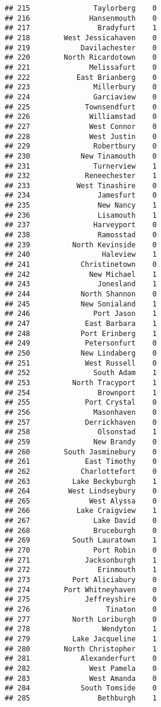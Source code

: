 \documentclass[
]{article}
\begin{document}
\begin{verbatim}
## 215               Taylorberg    0
## 216              Hansenmouth    0
## 217                Bradyfurt    1
## 218        West Jessicahaven    0
## 219            Davilachester    0
## 220        North Ricardotown    0
## 221              Melissafurt    0
## 222           East Brianberg    0
## 223               Millerbury    0
## 224               Garciaview    0
## 225             Townsendfurt    0
## 226              Williamstad    0
## 227              West Connor    0
## 228              West Justin    0
## 229               Robertbury    0
## 230            New Tinamouth    0
## 231               Turnerview    1
## 232             Reneechester    1
## 233           West Tinashire    0
## 234                Jamesfurt    0
## 235                New Nancy    1
## 236                Lisamouth    1
## 237               Harveyport    0
## 238                Ramosstad    0
## 239          North Kevinside    0
## 240                 Haleview    1
## 241            Christinetown    0
## 242              New Michael    1
## 243                Jonesland    1
## 244            North Shannon    0
## 245            New Sonialand    1
## 246               Port Jason    1
## 247             East Barbara    1
## 248            Port Erinberg    1
## 249             Petersonfurt    0
## 250            New Lindaberg    0
## 251             West Russell    0
## 252               South Adam    1
## 253          North Tracyport    1
## 254                Brownport    1
## 255             Port Crystal    0
## 256               Masonhaven    0
## 257             Derrickhaven    0
## 258                Olsonstad    1
## 259               New Brandy    0
## 260        South Jasminebury    0
## 261             East Timothy    0
## 262            Charlottefort    0
## 263          Lake Beckyburgh    1
## 264         West Lindseybury    0
## 265              West Alyssa    0
## 266           Lake Craigview    1
## 267               Lake David    0
## 268               Bruceburgh    0
## 269          South Lauratown    1
## 270               Port Robin    0
## 271             Jacksonburgh    1
## 272                Erinmouth    1
## 273          Port Aliciabury    0
## 274        Port Whitneyhaven    0
## 275             Jeffreyshire    0
## 276                  Tinaton    0
## 277          North Loriburgh    0
## 278                 Wendyton    1
## 279          Lake Jacqueline    1
## 280        North Christopher    1
## 281            Alexanderfurt    0
## 282              West Pamela    0
## 283              West Amanda    0
## 284            South Tomside    0
## 285                Bethburgh    1

\end{verbatim}
\end{document}
